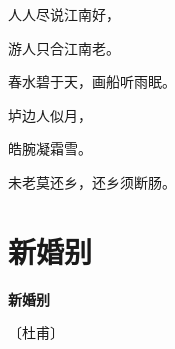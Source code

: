 \documentclass[12pt,UTF-8,openany,fontset=none]{ctexbook}
\begin{document}
    \vspace{18pt}  %

\begin{center}
    \begin{Large}

        人人尽说江南好，

        游人只合江南老。

        春水碧于天，画船听雨眠。

        \vspace{18pt}  %

        垆边人似月，

        皓腕凝霜雪。

        未老莫还乡，还乡须断肠。

    \end{Large}

\end{center}

\vspace{8pt}
\clearpage

\section{新婚别}


\begin{center}
    {\bfseries 新婚别}

    \vspace{18pt}

    \begin{large}\xuwen
        〔杜甫〕
    \end{large}

\end{center}

    \vspace{18pt}  %
\end{document}

